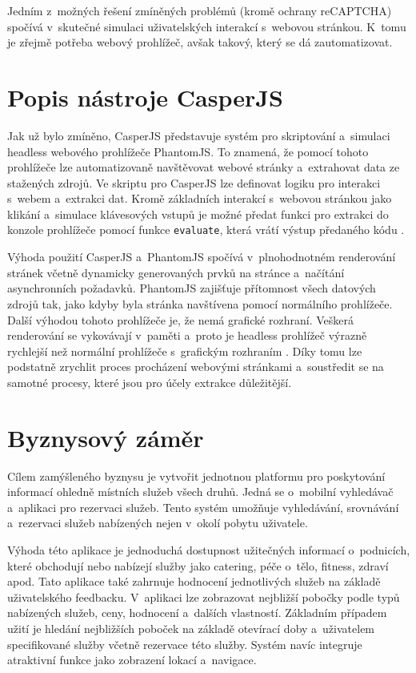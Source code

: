 \documentclass[11pt,a4paper]{article}
\begin{document}
Jedním z~možných řešení zmíněných problémů (kromě ochrany reCAPTCHA) spočívá v~skutečné simulaci uživatelských interakcí s~webovou stránkou. K~tomu je zřejmě potřeba webový prohlížeč, avšak takový, který se dá zautomatizovat.


\section{Popis nástroje CasperJS}
Jak už bylo zmíněno, CasperJS představuje systém pro skriptování a~simulaci headless webového prohlížeče PhantomJS. To znamená, že pomocí tohoto prohlížeče lze automatizovaně navštěvovat webové stránky a~extrahovat data ze stažených zdrojů. Ve skriptu pro CasperJS lze definovat logiku pro interakci s~webem a~extrakci dat. Kromě základních interakcí s~webovou stránkou jako klikání a~simulace klávesových vstupů je možné předat funkci pro extrakci do konzole prohlížeče pomocí funkce \texttt{evaluate}, která vrátí výstup předaného kódu \cite{hayton}.

Výhoda použití CasperJS a~PhantomJS spočívá v~plnohodnotném renderování stránek včetně dynamicky generovaných prvků na stránce a~načítání asynchronních požadavků. PhantomJS zajišťuje přítomnost všech datových zdrojů tak, jako kdyby byla stránka navštívena pomocí normálního prohlížeče. Další výhodou tohoto prohlížeče je, že nemá grafické rozhraní. Veškerá renderování se vykovávají v~paměti a~proto je headless prohlížeč výrazně rychlejší než normální prohlížeče s~grafickým rozhraním \cite{greco}. Díky tomu lze podstatně zrychlit proces procházení webovými stránkami a~soustředit se na samotné procesy, které jsou pro účely extrakce důležitější.


\section{Byznysový záměr}
Cílem zamýšleného byznysu je vytvořit jednotnou platformu pro poskytování informací ohledně místních služeb všech druhů. Jedná se o~mobilní vyhledávač a~aplikaci pro rezervaci služeb. Tento systém umožňuje vyhledávání, srovnávání a~rezervaci služeb nabízených  nejen v~okolí pobytu uživatele. 

Výhoda této aplikace je jednoduchá dostupnost užitečných informací o~podnicích, které obchodují nebo nabízejí služby jako catering, péče o~tělo, fitness, zdraví apod. Tato aplikace také zahrnuje hodnocení jednotlivých služeb na základě uživatelského feedbacku. V~aplikaci lze zobrazovat nejbližší pobočky podle typů nabízených služeb, ceny, hodnocení a~dalších vlastností. Základním případem užití je hledání nejbližších poboček na základě otevírací doby a~uživatelem specifikované služby včetně rezervace této služby. Systém navíc integruje atraktivní funkce jako zobrazení lokací a~navigace.
\end{document}
